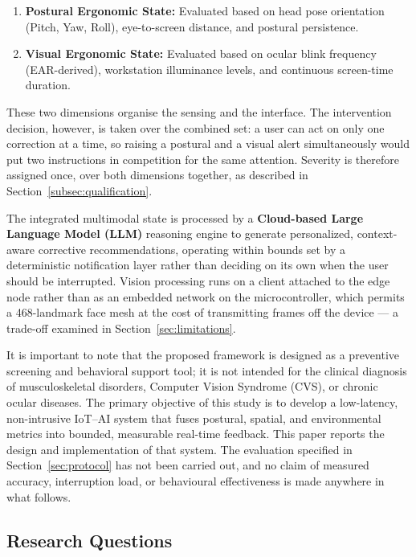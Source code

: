 \begin{enumerate}
    \item \textbf{Postural Ergonomic State:} Evaluated based on head pose orientation (Pitch, Yaw, Roll), eye-to-screen distance, and postural persistence.
    \item \textbf{Visual Ergonomic State:} Evaluated based on ocular blink frequency (EAR-derived), workstation illuminance levels, and continuous screen-time duration.
\end{enumerate}

These two dimensions organise the sensing and the interface. The intervention decision, however, is taken over the combined set: a user can act on only one correction at a time, so raising a postural and a visual alert simultaneously would put two instructions in competition for the same attention. Severity is therefore assigned once, over both dimensions together, as described in Section~\ref{subsec:qualification}.

The integrated multimodal state is processed by a \textbf{Cloud-based Large Language Model (LLM)} reasoning engine to generate personalized, context-aware corrective recommendations, operating within bounds set by a deterministic notification layer rather than deciding on its own when the user should be interrupted. Vision processing runs on a client attached to the edge node rather than as an embedded network on the microcontroller, which permits a 468-landmark face mesh at the cost of transmitting frames off the device --- a trade-off examined in Section~\ref{sec:limitations}.

It is important to note that the proposed framework is designed as a preventive screening and behavioral support tool; it is not intended for the clinical diagnosis of musculoskeletal disorders, Computer Vision Syndrome (CVS), or chronic ocular diseases. The primary objective of this study is to develop a low-latency, non-intrusive IoT--AI system that fuses postural, spatial, and environmental metrics into bounded, measurable real-time feedback. This paper reports the design and implementation of that system. The evaluation specified in Section~\ref{sec:protocol} has not been carried out, and no claim of measured accuracy, interruption load, or behavioural effectiveness is made anywhere in what follows.

\subsection{Research Questions}
\label{subsec:research_questions}

